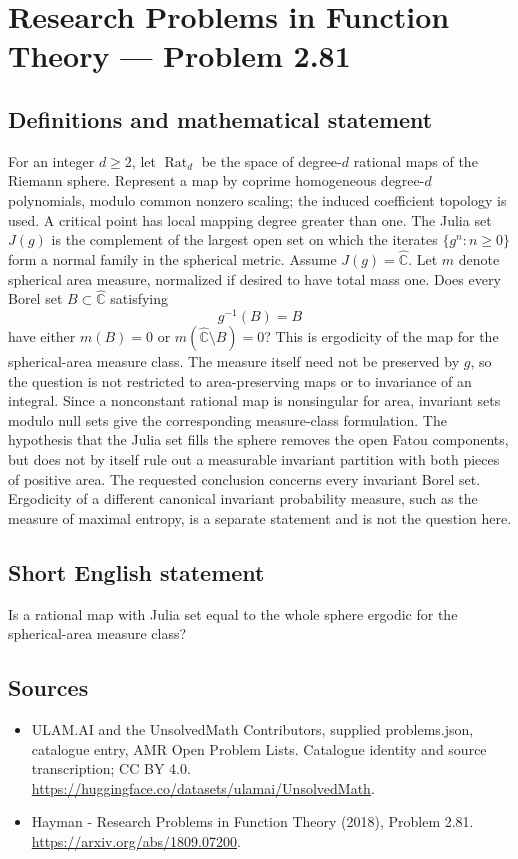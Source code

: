 \documentclass[11pt,a4paper]{article}
\begin{document}
\section*{Research Problems in Function Theory — Problem 2.81}\label{statement}

\subsection{Definitions and mathematical statement}
For an integer $d\ge2$, let $\operatorname{Rat}_d$ be the space of degree-$d$ rational maps of the Riemann sphere. Represent a map by coprime homogeneous degree-$d$ polynomials, modulo common nonzero scaling; the induced coefficient topology is used. A critical point has local mapping degree greater than one. The Julia set $J(g)$ is the complement of the largest open set on which the iterates $\{g^n:n\ge0\}$ form a normal family in the spherical metric.
Assume $J(g)=\widehat{\mathbb C}$. Let $m$ denote spherical area measure, normalized if desired to have total mass one. Does every Borel set $B\subset\widehat{\mathbb C}$ satisfying
\[
g^{-1}(B)=B
\]
have either $m(B)=0$ or $m(\widehat{\mathbb C}\setminus B)=0$?
This is ergodicity of the map for the spherical-area measure class. The measure itself need not be preserved by $g$, so the question is not restricted to area-preserving maps or to invariance of an integral. Since a nonconstant rational map is nonsingular for area, invariant sets modulo null sets give the corresponding measure-class formulation.
The hypothesis that the Julia set fills the sphere removes the open Fatou components, but does not by itself rule out a measurable invariant partition with both pieces of positive area. The requested conclusion concerns every invariant Borel set. Ergodicity of a different canonical invariant probability measure, such as the measure of maximal entropy, is a separate statement and is not the question here.
\subsection{Short English statement}
Is a rational map with Julia set equal to the whole sphere ergodic for the spherical-area measure class?
\subsection{Sources}
\begin{itemize}
\item[S1] ULAM.AI and the UnsolvedMath Contributors, supplied problems.json, catalogue entry, AMR Open Problem Lists. Catalogue identity and source transcription; CC BY 4.0.
\url{https://huggingface.co/datasets/ulamai/UnsolvedMath}.
\item[S2] Hayman - Research Problems in Function Theory (2018), Problem 2.81. 
\url{https://arxiv.org/abs/1809.07200}.
\end{itemize}
\end{document}
